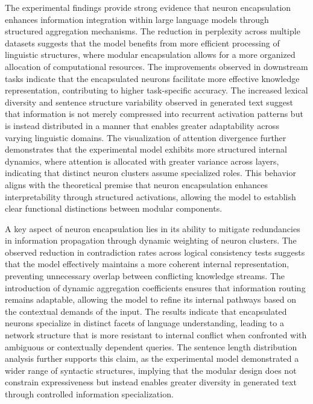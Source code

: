 \documentclass{article}
\begin{document}
The experimental findings provide strong evidence that neuron encapsulation enhances information integration within large language models through structured aggregation mechanisms. The reduction in perplexity across multiple datasets suggests that the model benefits from more efficient processing of linguistic structures, where modular encapsulation allows for a more organized allocation of computational resources. The improvements observed in downstream tasks indicate that the encapsulated neurons facilitate more effective knowledge representation, contributing to higher task-specific accuracy. The increased lexical diversity and sentence structure variability observed in generated text suggest that information is not merely compressed into recurrent activation patterns but is instead distributed in a manner that enables greater adaptability across varying linguistic domains. The visualization of attention divergence further demonstrates that the experimental model exhibits more structured internal dynamics, where attention is allocated with greater variance across layers, indicating that distinct neuron clusters assume specialized roles. This behavior aligns with the theoretical premise that neuron encapsulation enhances interpretability through structured activations, allowing the model to establish clear functional distinctions between modular components.

A key aspect of neuron encapsulation lies in its ability to mitigate redundancies in information propagation through dynamic weighting of neuron clusters. The observed reduction in contradiction rates across logical consistency tests suggests that the model effectively maintains a more coherent internal representation, preventing unnecessary overlap between conflicting knowledge streams. The introduction of dynamic aggregation coefficients ensures that information routing remains adaptable, allowing the model to refine its internal pathways based on the contextual demands of the input. The results indicate that encapsulated neurons specialize in distinct facets of language understanding, leading to a network structure that is more resistant to internal conflict when confronted with ambiguous or contextually dependent queries. The sentence length distribution analysis further supports this claim, as the experimental model demonstrated a wider range of syntactic structures, implying that the modular design does not constrain expressiveness but instead enables greater diversity in generated text through controlled information specialization.
\end{document}
